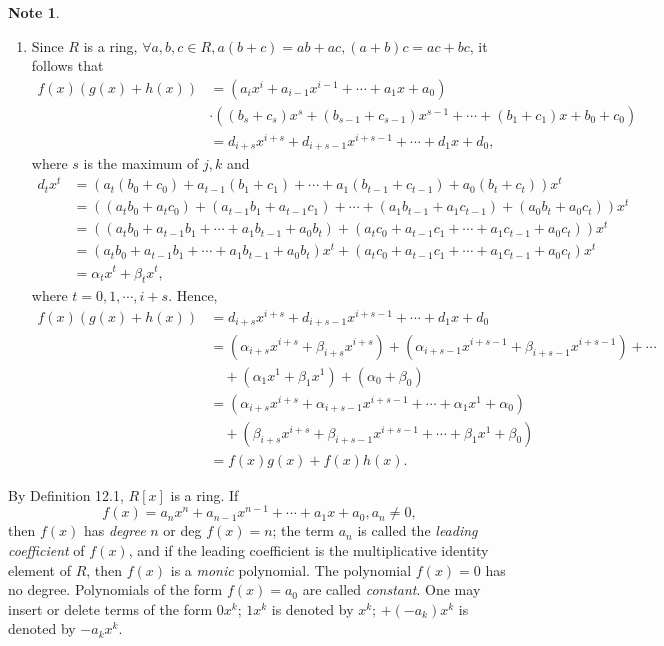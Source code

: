 \documentclass{article}
\theoremstyle{definition}
\newtheorem{note}{Note}[section]
\begin{document}
\begin{note}
\begin{enumerate}
        \item Since $R$ is a ring, $\forall a,b,c\in R, a(b+c)=ab+ac, (a+b)c=ac+bc$, it follows that
        \begin{align*}
            f(x)(g(x)+h(x)) &= (a_ix^i+a_{i-1}x^{i-1}+\cdots+a_1x+a_0) \\
            &\cdot ((b_s+c_s)x^s+(b_{s-1}+c_{s-1})x^{s-1}+\cdots+(b_1+c_1)x+b_0+c_0) \\
            &= d_{i+s}x^{i+s}+d_{i+s-1}x^{i+s-1}+\cdots+d_1x+d_0,
        \end{align*}
        where $s$ is the maximum of $j,k$ and 
        \begin{align*}
            d_tx^t&=(a_t(b_0+c_0)+a_{t-1}(b_1+c_1)+\cdots+a_1(b_{t-1}+c_{t-1})+a_0(b_t+c_t))x^t \\
            &=((a_tb_0+a_tc_0)+(a_{t-1}b_1+a_{t-1}c_1)+\cdots+(a_1b_{t-1}+a_1c_{t-1})+(a_0b_t+a_0c_t))x^t \\
            &=((a_tb_0+a_{t-1}b_1+\cdots+a_1b_{t-1}+a_0b_t)+(a_tc_0+a_{t-1}c_1+\cdots+a_1c_{t-1}+a_0c_t))x^t \\
            &=(a_tb_0+a_{t-1}b_1+\cdots+a_1b_{t-1}+a_0b_t)x^t+(a_tc_0+a_{t-1}c_1+\cdots+a_1c_{t-1}+a_0c_t)x^t \\
            &=\alpha_tx^t+\beta_tx^t,
        \end{align*}
        where $t=0,1,\cdots,i+s$. Hence,
        \begin{align*}
            f(x)(g(x)+h(x)) &= d_{i+s}x^{i+s}+d_{i+s-1}x^{i+s-1}+\cdots+d_1x+d_0 \\
            &= (\alpha_{i+s}x^{i+s}+\beta_{i+s}x^{i+s}) + (\alpha_{i+s-1}x^{i+s-1}+\beta_{i+s-1}x^{i+s-1}) + \cdots \\
            & \quad + (\alpha_1x^1+\beta_1x^1) + (\alpha_0+\beta_0) \\
            &= (\alpha_{i+s}x^{i+s}+\alpha_{i+s-1}x^{i+s-1}+\cdots+\alpha_1x^1+\alpha_0) \\ 
            & \quad + (\beta_{i+s}x^{i+s}+\beta_{i+s-1}x^{i+s-1}+\cdots+\beta_1x^1+\beta_0) \\
            &= f(x)g(x)+f(x)h(x).
        \end{align*}
    \end{enumerate}
    By Definition 12.1, $R[x]$ is a ring. If
    \begin{equation*}
        f(x)=a_nx^n+a_{n-1}x^{n-1}+\cdots+a_1x+a_0, a_n\neq0,
    \end{equation*}
    then $f(x)$ has \textit{degree} $n$ or deg $f(x)=n$; the term $a_n$ is called the \textit{leading coefficient} of $f(x)$, and if the leading coefficient is the multiplicative identity element of $R$, then $f(x)$ is a \textit{monic} polynomial. The polynomial $f(x)=0$ has no degree. Polynomials of the form $f(x)=a_0$ are called \textit{constant}. One may insert or delete terms of the form $0x^k$; $1x^k$ is denoted by $x^k$; $+(-a_k)x^k$ is denoted by $-a_kx^k$.
\end{note}
\end{document}
